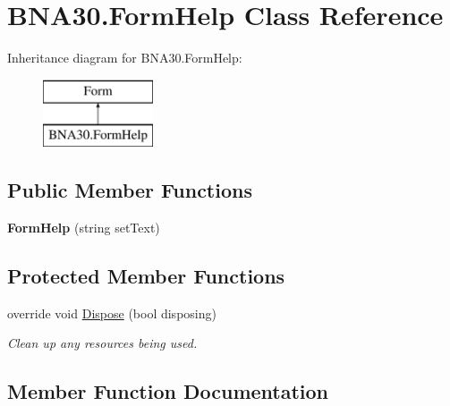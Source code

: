 \hypertarget{class_b_n_a30_1_1_form_help}{}\section{B\+N\+A30.\+Form\+Help Class Reference}
\label{class_b_n_a30_1_1_form_help}
Inheritance diagram for B\+N\+A30.\+Form\+Help\+:\begin{figure}[H]
\begin{center}
\leavevmode
\includegraphics[height=2.000000cm]{class_b_n_a30_1_1_form_help}
\end{center}
\end{figure}
\subsection*{Public Member Functions}
\begin{DoxyCompactItemize}
\item 
\mbox{\label{class_b_n_a30_1_1_form_help_aff1c2bdcf32a7340d7b99ebd1f797044}} 
{\bfseries Form\+Help} (string set\+Text)
\end{DoxyCompactItemize}
\subsection*{Protected Member Functions}
\begin{DoxyCompactItemize}
\item 
override void \mbox{\hyperlink{class_b_n_a30_1_1_form_help_ae7caaf3be1b717cb529d5e61d538d29e}{Dispose}} (bool disposing)
\begin{DoxyCompactList}\small\item\em Clean up any resources being used. \end{DoxyCompactList}\end{DoxyCompactItemize}


\subsection{Member Function Documentation}
\mbox{\label{class_b_n_a30_1_1_form_help_ae7caaf3be1b717cb529d5e61d538d29e}} 
